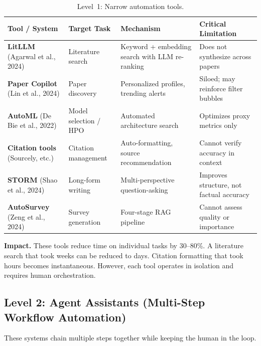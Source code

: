 \documentclass[11pt,a4paper]{article}
\begin{document}
\begin{table}[h]
\centering
\small
\begin{tabular}{@{}p{3.2cm}p{3cm}p{4cm}p{4cm}@{}}
\toprule
\textbf{Tool / System} & \textbf{Target Task} & \textbf{Mechanism} & \textbf{Critical Limitation} \\
\midrule
\textbf{LitLLM} (Agarwal et al., 2024) & Literature search & Keyword + embedding search with LLM re-ranking & Does not synthesize across papers \\
\textbf{Paper Copilot} (Lin et al., 2024) & Paper discovery & Personalized profiles, trending alerts & Siloed; may reinforce filter bubbles \\
\textbf{AutoML} (De Bie et al., 2022) & Model selection / HPO & Automated architecture search & Optimizes proxy metrics only \\
\textbf{Citation tools} (Sourcely, etc.) & Citation management & Auto-formatting, source recommendation & Cannot verify accuracy in context \\
\textbf{STORM} (Shao et al., 2024) & Long-form writing & Multi-perspective question-asking & Improves structure, not factual accuracy \\
\textbf{AutoSurvey} (Zeng et al., 2024) & Survey generation & Four-stage RAG pipeline & Cannot assess quality or importance \\
\bottomrule
\end{tabular}
\caption{Level~1: Narrow automation tools.}
\label{tab:level1}
\end{table}

\textbf{Impact.} These tools reduce time on individual tasks by 30--80\%. A literature search that took weeks can be reduced to days. Citation formatting that took hours becomes instantaneous. However, each tool operates in isolation and requires human orchestration.

\subsection{Level 2: Agent Assistants (Multi-Step Workflow Automation)}

These systems chain multiple steps together while keeping the human in the loop.
\end{document}
